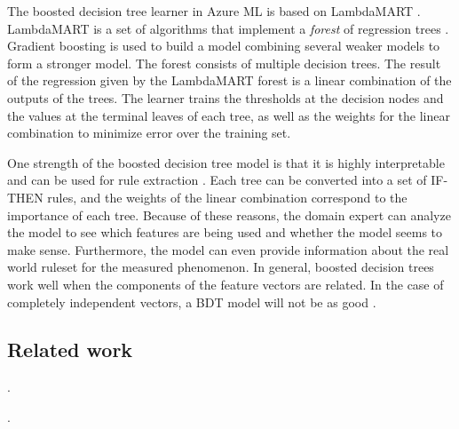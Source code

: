 The boosted decision tree learner in Azure ML is based on LambdaMART \cite{azurebdt}.
LambdaMART is a set of algorithms that implement a \textit{forest} of regression trees \cite{lambdamart2010}.
Gradient boosting  is used to build a model combining several weaker models to form a stronger model.
The forest consists of multiple decision trees.
The result of the regression given by the LambdaMART forest is a linear combination of the outputs of the trees.
The learner trains the thresholds at the decision nodes and the values at the terminal leaves of each tree, as well as the weights for the linear combination to minimize error over the training set.


One strength of the boosted decision tree model is that it is highly interpretable and can be used for rule extraction \cite{alpaydin}. Each tree can be converted into a set of IF-THEN rules, and the weights of the linear combination correspond to the importance of each tree. 
Because of these reasons, the domain expert can analyze the model to see which features are being used and whether the model seems to make sense.
Furthermore, the model can even provide information about the real world ruleset for the measured phenomenon.
In general, boosted decision trees work well when the components of the feature vectors are related. In the case of completely independent vectors, a BDT model will not be as good \cite{azurebdt}.


\subsection{Related work}
\label{sec:relatedwork}

 \cite{bezerra2009anomaly}.

 \cite{getta2014mining}.

